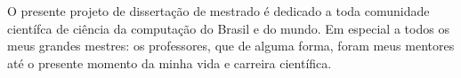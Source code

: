 O presente projeto de dissertação de mestrado é dedicado a toda comunidade
científca de ciência da computação do Brasil e do mundo.
Em especial a todos os meus grandes mestres: os professores, que de alguma
forma, foram meus mentores até o presente momento da minha vida e carreira
científica.

